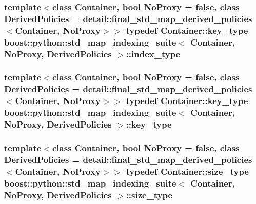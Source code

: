 \subsubsection[{index\+\_\+type}]{\setlength{\rightskip}{0pt plus 5cm}template$<$class Container, bool No\+Proxy = false, class Derived\+Policies = detail\+::final\+\_\+std\+\_\+map\+\_\+derived\+\_\+policies$<$\+Container, No\+Proxy$>$$>$ typedef Container\+::key\+\_\+type {\bf boost\+::python\+::std\+\_\+map\+\_\+indexing\+\_\+suite}$<$ Container, No\+Proxy, Derived\+Policies $>$\+::{\bf index\+\_\+type}}\label{classboost_1_1python_1_1std__map__indexing__suite_a4b2ac75883fba93dbca6d9e83197c842}
\hypertarget{classboost_1_1python_1_1std__map__indexing__suite_a4e2daeb60a58d6ce9964e0ea27680009}{}
\subsubsection[{key\+\_\+type}]{\setlength{\rightskip}{0pt plus 5cm}template$<$class Container, bool No\+Proxy = false, class Derived\+Policies = detail\+::final\+\_\+std\+\_\+map\+\_\+derived\+\_\+policies$<$\+Container, No\+Proxy$>$$>$ typedef Container\+::key\+\_\+type {\bf boost\+::python\+::std\+\_\+map\+\_\+indexing\+\_\+suite}$<$ Container, No\+Proxy, Derived\+Policies $>$\+::{\bf key\+\_\+type}}\label{classboost_1_1python_1_1std__map__indexing__suite_a4e2daeb60a58d6ce9964e0ea27680009}
\hypertarget{classboost_1_1python_1_1std__map__indexing__suite_ad1c24ad53b2e27b061f75591c74296c2}{}
\subsubsection[{size\+\_\+type}]{\setlength{\rightskip}{0pt plus 5cm}template$<$class Container, bool No\+Proxy = false, class Derived\+Policies = detail\+::final\+\_\+std\+\_\+map\+\_\+derived\+\_\+policies$<$\+Container, No\+Proxy$>$$>$ typedef Container\+::size\+\_\+type {\bf boost\+::python\+::std\+\_\+map\+\_\+indexing\+\_\+suite}$<$ Container, No\+Proxy, Derived\+Policies $>$\+::{\bf size\+\_\+type}}\label{classboost_1_1python_1_1std__map__indexing__suite_ad1c24ad53b2e27b061f75591c74296c2}
\hypertarget{classboost_1_1python_1_1std__map__indexing__suite_aff9ed68cf30e805a04a313d92c62ab38}{}
